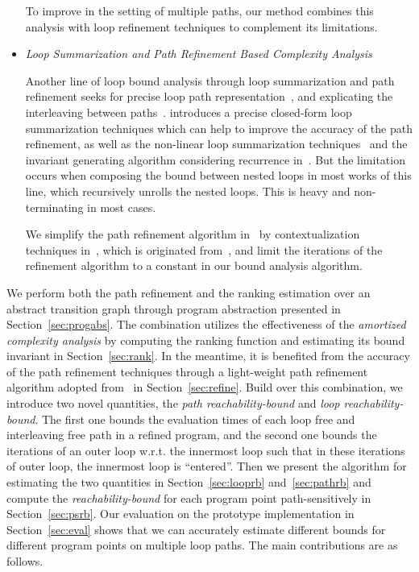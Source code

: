 \begin{itemize}
  To improve in the setting of multiple paths, our method combines this analysis with loop refinement techniques to complement its limitations.
\item
\emph{Loop Summarization and Path Refinement Based Complexity Analysis}

Another line of loop bound analysis through loop summarization and path refinement seeks for precise loop path representation~\cite{ManoliosV06,BalakrishnanSIG09,SharmaDDA11,Flores-MontoyaH14,HumenbergerJK18,CyphertBKR19}, and explicating the interleaving between paths~\cite{GulwaniJK09,ZulegerGSV11}.
\cite{KincaidBCR19} introduces a precise closed-form loop summarization techniques which can help to improve the accuracy of the path refinement, as well as the non-linear loop summarization techniques~\cite{KincaidCBR18} and the invariant generating algorithm considering recurrence in~\cite{BreckCKR20}. 
But the limitation occurs when composing the bound between nested loops in most works of this line, which recursively unrolls the nested loops. This is heavy and non-terminating in most cases.

We simplify the path refinement algorithm in~\cite{GulwaniJK09} by contextualization techniques in~\cite{ZulegerGSV11,SinnZV14}, which is originated from~\cite{ManoliosV06},
and limit the iterations of the refinement algorithm to a constant in our bound analysis algorithm.
\end{itemize}
%
We perform both the path refinement and the ranking estimation over an abstract transition graph through program abstraction presented in Section~\ref{sec:progabs}.
The combination utilizes the effectiveness of the \emph{amortized complexity analysis} by computing the ranking function
and estimating its bound invariant in Section~\ref{sec:rank}.
In the meantime, it is benefited from the accuracy of the path refinement techniques through a light-weight path refinement algorithm adopted from~\cite{GulwaniJK09} in Section~\ref{sec:refine}.
Build over this combination, we introduce two novel quantities,
the \emph{path reachability-bound} and \emph{loop reachability-bound}.
The first one bounds the evaluation times of each loop free and interleaving free path in a refined program, and the second one bounds the iterations of an outer loop w.r.t. the innermost loop such that in these iterations of outer loop, the innermost loop is ``entered''. 
Then we present the algorithm for estimating the two quantities in Section~\ref{sec:looprb} and~\ref{sec:pathrb} and compute the \emph{reachability-bound} for each program point path-sensitively in Section~\ref{sec:psrb}.
Our evaluation on the prototype implementation in Section~\ref{sec:eval} shows that we can accurately estimate different bounds for different program points on multiple loop paths. The main contributions are as follows.

